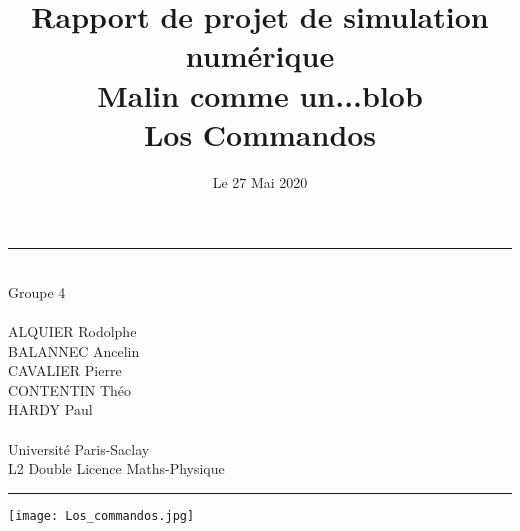 \documentclass{article}
\date{Le 27 Mai 2020}
\begin{document}
\newpage

\title{\Huge{Rapport de projet de simulation numérique \\ \textbf{Malin comme un...blob\\}
}}
\vspace{0.5cm}


\maketitle


\begin{center}
    \rule{0.9\linewidth}{0.5pt}\\
        \vspace{5mm}
        Groupe 4\\ 
        \ \\
	    ALQUIER Rodolphe\\
      BALANNEC Ancelin\\
      CAVALIER Pierre\\
      CONTENTIN Théo\\
      HARDY Paul\\
	    \ \\
		Université Paris-Saclay\\
		L2 Double Licence Maths-Physique\\
        \vspace{5mm}	
\rule{0.9\linewidth}{0.5pt}
\vspace{0.5cm}
\end{center}
\begin{center}
\title{\Huge\textbf{{Los Commandos}}}
\end{center}

\begin{center}
\texttt{[image: Los\_commandos.jpg]}
\end{center}
\end{document}
